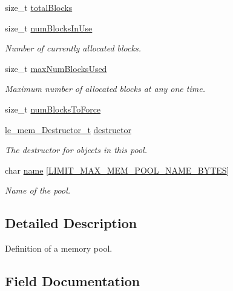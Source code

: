 \begin{DoxyCompactItemize}
size\+\_\+t \hyperlink{struct_mem_pool__t_aae323b1a482e692b631de24ce93815e6}{total\+Blocks}
\item 
size\+\_\+t \hyperlink{struct_mem_pool__t_a42d4e1c8515867a659186e7e0e9a8e63}{num\+Blocks\+In\+Use}
\begin{DoxyCompactList}\small\item\em Number of currently allocated blocks. \end{DoxyCompactList}\item 
size\+\_\+t \hyperlink{struct_mem_pool__t_a45c35c9d71806c72b412e0f02ac465f7}{max\+Num\+Blocks\+Used}
\begin{DoxyCompactList}\small\item\em Maximum number of allocated blocks at any one time. \end{DoxyCompactList}\item 
size\+\_\+t \hyperlink{struct_mem_pool__t_a27ee133a83711385f3f9d6520ab4b4b3}{num\+Blocks\+To\+Force}
\item 
\hyperlink{le__mem_8h_afe3d1a458511f0a2e2bcef0827306b79}{le\+\_\+mem\+\_\+\+Destructor\+\_\+t} \hyperlink{struct_mem_pool__t_a73d209fbb8f55e0d6a939774613e62f9}{destructor}
\begin{DoxyCompactList}\small\item\em The destructor for objects in this pool. \end{DoxyCompactList}\item 
char \hyperlink{struct_mem_pool__t_a216ed38243abe9e06bb4da632f9f4fe2}{name} \mbox{[}\hyperlink{limit_8h_a089f06d273b054f909c21c092d4b3918}{L\+I\+M\+I\+T\+\_\+\+M\+A\+X\+\_\+\+M\+E\+M\+\_\+\+P\+O\+O\+L\+\_\+\+N\+A\+M\+E\+\_\+\+B\+Y\+T\+ES}\mbox{]}
\begin{DoxyCompactList}\small\item\em Name of the pool. \end{DoxyCompactList}\end{DoxyCompactItemize}


\subsection{Detailed Description}
Definition of a memory pool. 

\subsection{Field Documentation}
